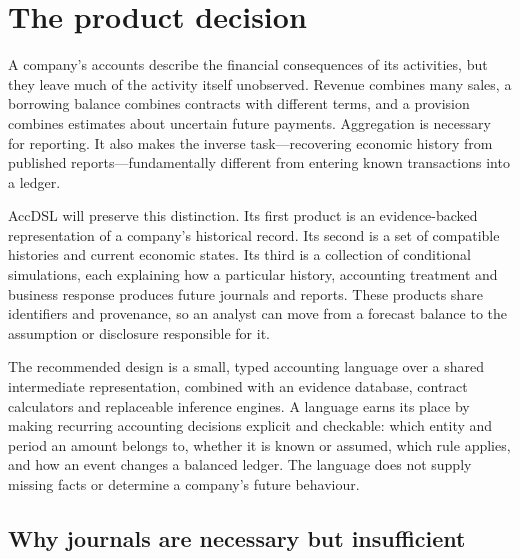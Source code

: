 \chapter{The product decision}
\label{ch:purpose}

A company's accounts describe the financial consequences of its activities,
but they leave much of the activity itself unobserved. Revenue combines many
sales, a borrowing balance combines contracts with different terms, and a
provision combines estimates about uncertain future payments. Aggregation is
necessary for reporting. It also makes the inverse task---recovering economic
history from published reports---fundamentally different from entering known
transactions into a ledger.

AccDSL will preserve this distinction. Its first product is an evidence-backed
representation of a company's historical record. Its second is a set of
compatible histories and current economic states. Its third is a collection of
conditional simulations, each explaining how a particular history, accounting
treatment and business response produces future journals and reports. These
products share identifiers and provenance, so an analyst can move from a
forecast balance to the assumption or disclosure responsible for it.

The recommended design is a small, typed accounting language over a shared
intermediate representation, combined with an evidence database, contract
calculators and replaceable inference engines. A language earns its place by
making recurring accounting decisions explicit and checkable: which entity and
period an amount belongs to, whether it is known or assumed, which rule applies,
and how an event changes a balanced ledger. The language does not supply missing
facts or determine a company's future behaviour.

\section{Why journals are necessary but insufficient}

